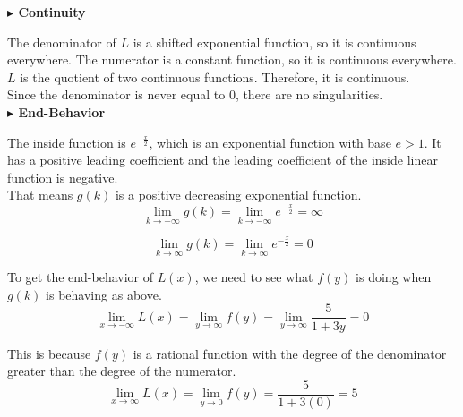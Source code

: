 \documentclass{ximera}
\begin{document}
\begin{example}
\textbf{\textcolor{blue!55!black}{$\blacktriangleright$ Continuity}} 


The denominator of $L$ is a shifted exponential function, so it is continuous everywhere. The numerator is a constant function, so it is continuous everywhere.  $L$ is the quotient of two continuous functions.  Therefore, it is continuous. \\


Since the denominator is never equal to $0$, there are no singularities. \\














\textbf{\textcolor{blue!55!black}{$\blacktriangleright$ End-Behavior}} 


The inside function is $e^{-\tfrac{x}{2}}$, which is an exponential function with base $e > 1$.  It has a positive leading coefficient and the leading coefficient of the inside linear function is negative. \\

That means $g(k)$ is a positive decreasing exponential function. \\



\[  
\lim\limits_{k \to -\infty}g(k) = \lim\limits_{k \to -\infty}e^{-\tfrac{x}{2}} = \infty
\]




\[  
\lim\limits_{k \to \infty}g(k) = \lim\limits_{k \to \infty}e^{-\tfrac{x}{2}} = 0
\]




To get the end-behavior of $L(x)$, we need to see what $f(y)$ is doing when $g(k)$ is behaving as above. \\





\[  
\lim\limits_{x \to -\infty}L(x) = \lim\limits_{y \to \infty}f(y) = \lim\limits_{y \to \infty}\frac{5}{1 + 3 y} = 0
\]

This is because $f(y)$ is a rational function with the degree of the denominator greater than the degree of the numerator. \\






\[  
\lim\limits_{x \to \infty}L(x) = \lim\limits_{y \to 0}f(y) = \frac{5}{1 + 3 (0)} = 5
\]




\end{example}
\end{document}
